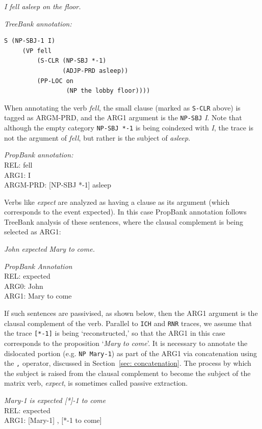 \documentclass[11pt]{report}
\begin{document}
\textit{I fell asleep on the floor.}
 
\textit{TreeBank annotation:}
 \begin{verbatim}
S (NP-SBJ-1 I)
     (VP fell
         (S-CLR (NP-SBJ *-1)
                (ADJP-PRD asleep))
         (PP-LOC on
                 (NP the lobby floor))))
 \end{verbatim}

When annotating the verb \textit{fell}, the small clause (marked as \texttt{S-CLR} above) is tagged as ARGM-PRD, and the ARG1 argument is the \texttt{NP-SBJ} \textit{I}. Note that although the empty category \texttt{NP-SBJ *-1} is being coindexed with \textit{I}, the trace is not the argument of \textit{fell}, but rather is the subject of \textit{asleep}. 

\textit{PropBank annotation:}\\
REL:	fell\\
ARG1:	I\\
ARGM-PRD: [NP-SBJ *-1] asleep

Verbs like \textit{expect} are analyzed as having a clause as its argument (which corresponds to the event expected). In this case PropBank annotation follows TreeBank analysis of these sentences, where the clausal complement is being selected as ARG1:

\textit{John expected Mary to come.}

\textit{PropBank Annotation}\\
REL: 	expected\\
ARG0:	John\\
ARG1:	Mary to come

If such sentences are passivised, as shown below, then the ARG1 argument is the clausal complement of the verb. Parallel to \texttt{ICH} and \texttt{RNR} traces, we assume that the trace \texttt{[*-1]} is being `reconstructed,' so that the ARG1 in this case corresponds to the proposition `\textit{Mary to come}'. It is necessary to annotate the dislocated portion (e.g. \texttt{NP Mary-1}) as part of the ARG1 via concatenation using the \texttt{,} operator, discussed in Section~\ref{sec: concatenation}.  The process by which the subject is raised from the clausal complement to become the subject of the matrix verb, \textit{expect}, is sometimes called passive extraction. 

\textit{Mary-1 is expected [*]-1 to come}\\
REL:	expected\\
ARG1:	[Mary-1] , [*-1 to come]
\end{document}
